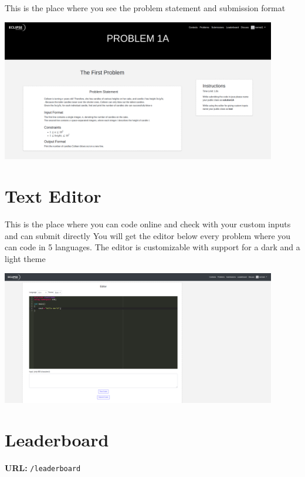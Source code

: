 \documentclass[hidelinks, a4paper,12pt, titlepage]{article}
\begin{document}
This is the place where you see the problem statement and submission format
\begin{center}\includegraphics[width=0.9\textwidth]{problemstatement.png}\end{center}
 
 \newpage

\section{Text Editor}
This is the place where you can code online and check with your custom inputs and can submit directly 
You will get the editor below every problem where you can code in 5 languages. The editor is customizable with support for a dark and a light theme
\begin{center}\includegraphics[width=0.9\textwidth]{texteditor.png}\end{center}
 
\section{Leaderboard}
\textbf{URL:} \texttt{/leaderboard}
\end{document}
